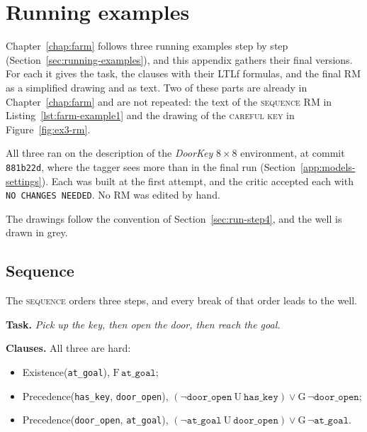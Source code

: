 \documentclass[11pt,english,listoffigures,listoftables]{tfgetsinf}
\newcommand{\runex}[1]{\textsc{#1}}  %
\newcommand{\env}[1]{\textsf{\slshape #1}}  %
\begin{document}

\chapter{Running examples}
\label{app:running}
Chapter~\ref{chap:farm} follows three running examples step by step (Section~\ref{sec:running-examples}), and this appendix gathers their final versions. For each it gives the task, the clauses with their LTLf formulas, and the final RM as a simplified drawing and as text. Two of these parts are already in Chapter~\ref{chap:farm} and are not repeated: the text of the \runex{sequence} RM in Listing~\ref{lst:farm-example1} and the drawing of the \runex{careful key} in Figure~\ref{fig:ex3-rm}.

All three ran on the description of the \env{DoorKey} $8 \times 8$ environment, at commit \texttt{881b22d}, where the tagger sees more than in the final run (Section~\ref{app:models-settings}). Each was built at the first attempt, and the critic accepted each with \texttt{NO CHANGES NEEDED}. No RM was edited by hand.

The drawings follow the convention of Section~\ref{sec:run-step4}, and the well is drawn in grey.

\section{Sequence}
The \runex{sequence} orders three steps, and every break of that order leads to the well.

\textbf{Task.} \textit{Pick up the key, then open the door, then reach the goal.}

\textbf{Clauses.} All three are hard:
\begin{itemize}
    \item Existence(\texttt{at\_goal}), $\mathrm{F}\,\texttt{at\_goal}$;
    \item Precedence(\texttt{has\_key}, \texttt{door\_open}), $(\neg\texttt{door\_open}\ \mathrm{U}\ \texttt{has\_key}) \lor \mathrm{G}\,\neg\texttt{door\_open}$;
    \item Precedence(\texttt{door\_open}, \texttt{at\_goal}), $(\neg\texttt{at\_goal}\ \mathrm{U}\ \texttt{door\_open}) \lor \mathrm{G}\,\neg\texttt{at\_goal}$.
\end{itemize}
\end{document}
